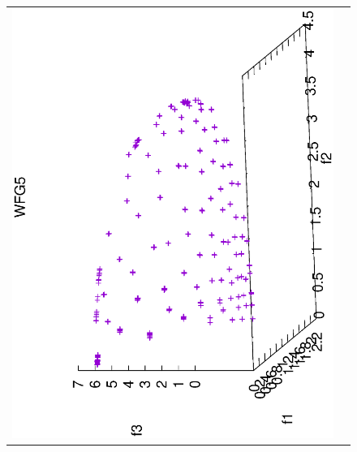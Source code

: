 \begin{figure}[H]
\begin{tabular}{cc}
  \includegraphics[scale=0.3, angle=-90,origin=c]{Figures_Chapter7/Results_Chapter4/Summary_Representative/VSD-MOEA-D/WFG5.eps} \\

\end{tabular}
\end{figure}
